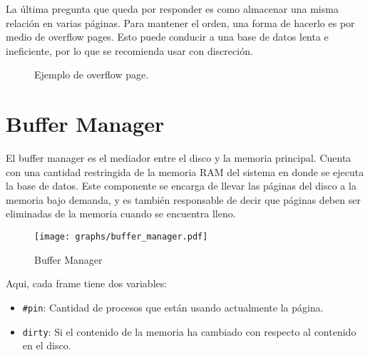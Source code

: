 La última pregunta que queda por responder es como almacenar una misma relación en varias páginas. Para mantener el orden, una forma de hacerlo es por medio de overflow pages. Esto puede conducir a una base de datos lenta e ineficiente, por lo que se recomienda usar con discreción.

\begin{figure}[h]
  \centering
  \caption{Ejemplo de overflow page.}
\end{figure}


\section{Buffer Manager}
El buffer manager es el mediador entre el disco y la memoria principal. Cuenta con una cantidad restringida de la memoria RAM del sistema en donde se ejecuta la base de datos. Este componente se encarga de llevar las páginas del disco a la memoria bajo demanda, y es también responsable de decir que páginas deben ser eliminadas de la memoria cuando se encuentra lleno.

\begin{figure}[h]
  \centering
  \texttt{[image: graphs/buffer\_manager.pdf]}
  \caption{Buffer Manager}
\end{figure}

Aqui, cada frame tiene dos variables:
\begin{itemize}
  \item \texttt{\#pin}: Cantidad de procesos que están usando actualmente la página.
  \item \texttt{dirty}: Si el contenido de la memoria ha cambiado con respecto al contenido en el disco.
\end{itemize}

